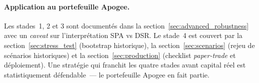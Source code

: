 \paragraph{Application au portefeuille Apogee.} Les stades~1, 2 et 3 sont documentés dans la section~\ref{sec:advanced_robustness} avec un \emph{caveat} sur l'interprétation SPA vs DSR. Le stade~4 est couvert par la section~\ref{sec:stress_test} (bootstrap historique), la section~\ref{sec:scenarios} (rejeu de scénarios historiques) et la section~\ref{sec:production} (checklist \emph{paper-trade} et déploiement). Une stratégie qui franchit les quatre stades avant capital réel est statistiquement défendable~--- le portefeuille Apogee en fait partie.
